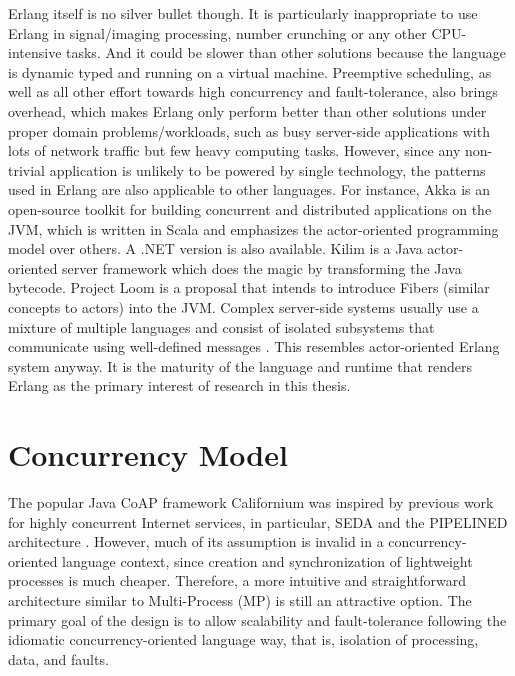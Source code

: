 Erlang itself is no silver bullet though. It is particularly inappropriate to use Erlang in signal/imaging processing, number crunching or any other CPU-intensive tasks. And it could be slower than other solutions because the language is dynamic typed and running on a virtual machine. Preemptive scheduling, as well as all other effort towards high concurrency and fault-tolerance, also brings overhead, which makes Erlang only perform better than other solutions under proper domain problems/workloads, such as busy server-side applications with lots of network traffic but few heavy computing tasks. However, since any non-trivial application is unlikely to be powered by single technology, the patterns used in Erlang are also applicable to other languages. For instance, Akka \autocite{akka} is an open-source toolkit for building concurrent and distributed applications on the JVM, which is written in Scala and emphasizes the actor-oriented programming model over others. A .NET version is also available. Kilim \autocite{srinivasan2008kilim}\autocite{UCAM-CL-TR-769} is a Java actor-oriented server framework which does the magic by transforming the Java bytecode. Project Loom \autocite{java-loom} is a proposal that intends to introduce Fibers (similar concepts to actors) into the JVM. Complex server-side systems usually use a mixture of multiple languages and consist of isolated subsystems that communicate using well-defined messages \autocite{UCAM-CL-TR-769}. This resembles actor-oriented Erlang system anyway. It is the maturity of the language and runtime that renders Erlang as the primary interest of research in this thesis.

\section{Concurrency Model}

The popular Java CoAP framework Californium was inspired by previous work for highly concurrent Internet services, in particular, SEDA and the PIPELINED architecture \autocite{lanter2013scalability}. However, much of its assumption is invalid in a concurrency-oriented language context, since creation and synchronization of lightweight processes is much cheaper. Therefore, a more intuitive and straightforward architecture similar to Multi-Process (MP) is still an attractive option. The primary goal of the design is to allow scalability and fault-tolerance following the idiomatic concurrency-oriented language way, that is, isolation of processing, data, and faults. 

